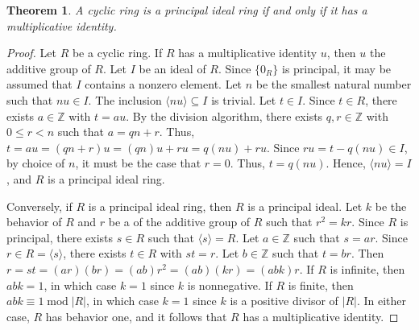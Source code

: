 \documentclass[12pt]{article}
\newtheorem*{thm*}{Theorem}
\begin{document}
\begin{thm*}
A cyclic ring is a principal ideal ring if and only if it has a multiplicative identity.
\end{thm*}

\begin{proof}
Let $R$ be a cyclic ring.  If $R$ has a multiplicative identity $u$, then $u$  the additive group of $R$.  Let $I$ be an ideal of $R$.  Since $\{0_R\}$ is principal, it may be assumed that $I$ contains a nonzero element.  Let $n$ be the smallest natural number such that $nu \in I$.  The inclusion $\langle nu \rangle \subseteq I$ is trivial.  Let $t \in I$.  Since $t \in R$, there exists $a \in \mathbb{Z}$ with $t=au$.  By the division algorithm, there exists $q,r \in \mathbb{Z}$ with $0 \le r < n$ such that $a=qn+r$.  Thus, $t=au=(qn+r)u=(qn)u+ru=q(nu)+ru$.  Since $ru=t-q(nu) \in I$, by choice of $n$, it must be the case that $r=0$.  Thus, $t=q(nu)$.  Hence, $\langle nu \rangle = I$, and $R$ is a principal ideal ring.

Conversely, if $R$ is a principal ideal ring, then $R$ is a principal ideal.  Let $k$ be the behavior of $R$ and $r$ be a  of the additive group of $R$ such that $r^2=kr$.  Since $R$ is principal, there exists $s \in R$ such that $\langle s \rangle = R$.  Let $a \in \mathbb{Z}$ such that $s=ar$.  Since $r \in R = \langle s \rangle$, there exists $t \in R$ with $st=r$.  Let $b \in \mathbb{Z}$ such that $t=br$.  Then $r=st=(ar)(br)=(ab)r^2=(ab)(kr)=(abk)r$.  If $R$ is infinite, then $abk=1$, in which case $k=1$ since $k$ is nonnegative.  If $R$ is finite, then $abk \equiv 1 \operatorname{mod} |R|$, in which case $k=1$ since $k$ is a positive divisor of $|R|$.  In either case, $R$ has behavior one, and it follows that $R$ has a multiplicative identity.
\end{proof}
\end{document}

